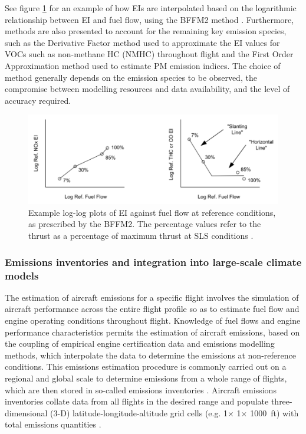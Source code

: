 See figure \ref{BFFM2} for an example of how EIs are interpolated based on the logarithmic relationship between EI and fuel flow, using the BFFM2 method \cite{Wasiuk2014}. Furthermore, methods are also presented to account for the remaining key emission species, such as the Derivative Factor method \cite{AEDT} used to approximate the EI values for VOCs such as non-methane HC (NMHC) throughout flight and the First Order Approximation method \cite{Wayson2012} used to estimate PM emission indices. The choice of method generally depends on the emission species to be observed, the compromise between modelling resources and data availability, and the level of accuracy required.

\begin{figure}[H]
  \centering
  \includegraphics[width=0.9\linewidth]{BFFM2_output_example.png}
  \caption{Example log-log plots of EI against fuel flow at reference conditions, as prescribed by the BFFM2. The percentage values refer to the thrust as a percentage of maximum thrust at SLS conditions \cite{AIR5715}.}
  \label{BFFM2}
\end{figure}

\subsubsection{Emissions inventories and integration into large-scale climate models}
The estimation of aircraft emissions for a specific flight involves the simulation of aircraft performance across the entire flight profile so as to estimate fuel flow and engine operating conditions throughout flight. Knowledge of fuel flows and engine performance characteristics permits the estimation of aircraft emissions, based on the coupling of empirical engine certification data and emissions modelling methods, which interpolate the data to determine the emissions at non-reference conditions. This emissions estimation procedure is commonly carried out on a regional and global scale to determine emissions from a whole range of flights, which are then stored in so-called emissions inventories \cite{Wasiuk2016}. Aircraft emissions inventories collate data from all flights in the desired range and populate three-dimensional (3-D) latitude-longitude-altitude grid cells (e.g. 1\textdegree $\times$ 1\textdegree $\times$ 1000~ft) with total emissions quantities \cite{Paoli2011}. 

